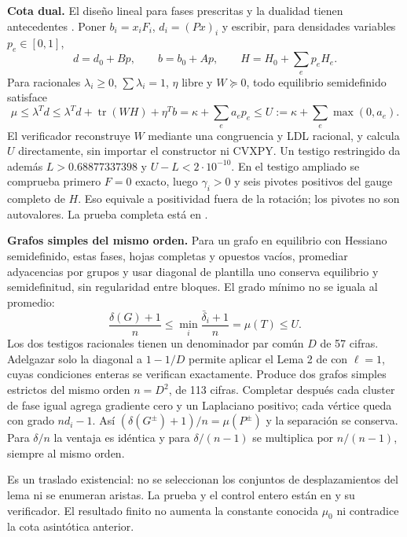 \documentclass[10pt,a4paper]{article}
\newcommand{\muo}{\mu_0}
\begin{document}
\textbf{Cota dual.} El diseño lineal para fases prescritas y la dualidad tienen antecedentes \cite{menara,boyd}. Poner $b_i=x_iF_i$, $d_i=(Px)_i$ y escribir, para densidades variables $p_e\in[0,1]$,
\[
 d=d_0+Bp,\qquad b=b_0+Ap,\qquad H=H_0+\sum_e p_eH_e.
\]
Para racionales $\lambda_i\geq0$, $\sum\lambda_i=1$, $\eta$ libre y $W\succeq0$, todo equilibrio semidefinido satisface
\[
 \mu\leq\lambda^Td\leq\lambda^Td+\operatorname{tr}(WH)+\eta^Tb
 =\kappa+\sum_e a_ep_e\leq U:=\kappa+\sum_e\max(0,a_e).
\]
El verificador reconstruye $W$ mediante una congruencia y LDL racional, y calcula $U$ directamente, sin importar el constructor ni CVXPY. Un testigo restringido da además $L>0.68877337398$ y $U-L<2\cdot10^{-10}$. En el testigo ampliado se comprueba primero $F=0$ exacto, luego $\gamma_i>0$ y seis pivotes positivos del gauge completo de $H$. Eso equivale a positividad fuera de la rotación; los pivotes no son autovalores. La prueba completa está en .

\textbf{Grafos simples del mismo orden.} Para un grafo en equilibrio con Hessiano semidefinido, estas fases, hojas completas y opuestos vacíos, promediar adyacencias por grupos y usar diagonal de plantilla uno conserva equilibrio y semidefinitud, sin regularidad entre bloques. El grado mínimo no se iguala al promedio:
\[
 \frac{\delta(G)+1}{n}\leq\min_i\frac{\bar\delta_i+1}{n}=\mu(T)\leq U.
\]
Los dos testigos racionales tienen un denominador par común $D$ de 57 cifras. Adelgazar solo la diagonal a $1-1/D$ permite aplicar el Lema 2 de \cite{okeeffe} con $\ell=1$, cuyas condiciones enteras se verifican exactamente. Produce dos grafos simples estrictos del mismo orden $n=D^2$, de 113 cifras. Completar después cada cluster de fase igual agrega gradiente cero y un Laplaciano positivo; cada vértice queda con grado $nd_i-1$. Así $(\delta(G^\pm)+1)/n=\mu(P^\pm)$ y la separación se conserva. Para $\delta/n$ la ventaja es idéntica y para $\delta/(n-1)$ se multiplica por $n/(n-1)$, siempre al mismo orden.

Es un traslado existencial: no se seleccionan los conjuntos de desplazamientos del lema ni se enumeran aristas. La prueba y el control entero están en  y su verificador. El resultado finito no aumenta la constante conocida $\muo$ ni contradice la cota asintótica anterior.
\end{document}
